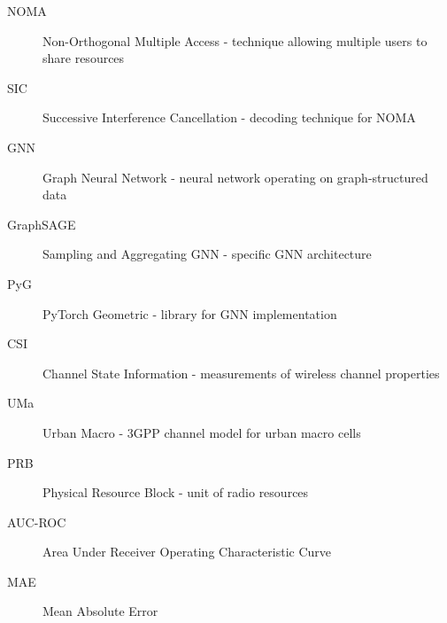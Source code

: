 \documentclass[12pt,a4paper]{article}
\begin{document}
\begin{description}
    \item[NOMA] Non-Orthogonal Multiple Access - technique allowing multiple users to share resources
    \item[SIC] Successive Interference Cancellation - decoding technique for NOMA
    \item[GNN] Graph Neural Network - neural network operating on graph-structured data
    \item[GraphSAGE] Sampling and Aggregating GNN - specific GNN architecture
    \item[PyG] PyTorch Geometric - library for GNN implementation
    \item[CSI] Channel State Information - measurements of wireless channel properties
    \item[UMa] Urban Macro - 3GPP channel model for urban macro cells
    \item[PRB] Physical Resource Block - unit of radio resources
    \item[AUC-ROC] Area Under Receiver Operating Characteristic Curve
    \item[MAE] Mean Absolute Error
\end{description}
\end{document}
